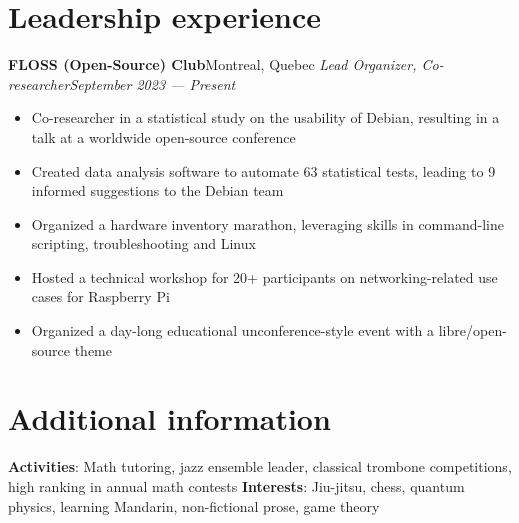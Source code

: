 \documentclass{article}
\newcommand{\newrole}[4]{
    {\normalfont\textbf{#1}\hfill#3}
    \newline
    \textit{#2}\hfill\textit{#4}
}
\newenvironment{bulletpoints}{\begin{itemize}\setlength\itemsep{-0.3em}}{\end{itemize}}
\begin{document}
\section*{Leadership experience}
\newrole{FLOSS (Open-Source) Club}{Lead Organizer, Co-researcher}{Montreal, Quebec}{September 2023 --- Present}
\begin{bulletpoints}
    \item Co-researcher in a statistical study on the usability of Debian, resulting in a talk at a worldwide open-source conference
    \item Created data analysis software to automate 63 statistical tests, leading to 9 informed suggestions to the Debian team
    \item Organized a hardware inventory marathon, leveraging skills in command-line scripting, troubleshooting and Linux
    \item Hosted a technical workshop for 20+ participants on networking-related use cases for Raspberry Pi
    \item Organized a day-long educational unconference-style event with a libre/open-source theme
\end{bulletpoints}


\section*{Additional information}
{\bfseries Activities}: Math tutoring, jazz ensemble leader, classical trombone competitions, high ranking in annual math contests
\newline
{\bfseries Interests}: Jiu-jitsu, chess, quantum physics, learning Mandarin, non-fictional prose, game theory
\end{document}
